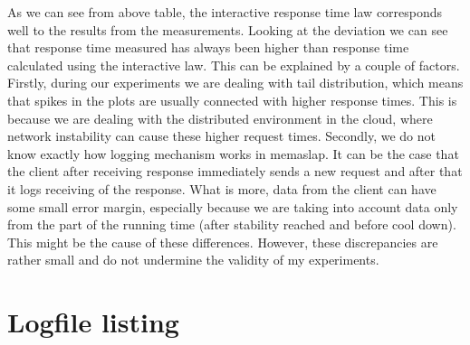 \documentclass[11pt]{article}
\begin{document}
As we can see from above table, the interactive response time law corresponds well to the results from the measurements. Looking at the deviation we can see that response time measured has always been higher than response time calculated using the interactive law. This can be explained by a couple of factors. Firstly, during our experiments we are dealing with tail distribution, which means that spikes in the plots are usually connected with higher response times. This is because we are dealing with the distributed environment in the cloud, where network instability can cause these higher request times. Secondly, we do not know exactly how logging mechanism works in memaslap. It can be the case that the client after receiving response immediately sends a new request and after that it logs receiving of the response. What is more, data from the client can have some small error margin, especially because we are taking into account data only from the part of the running time (after stability reached and before cool down). This might be the cause of these differences. However, these discrepancies are rather small and do not undermine the validity of my experiments.

\pagebreak

\section*{Logfile listing}
\end{document}
